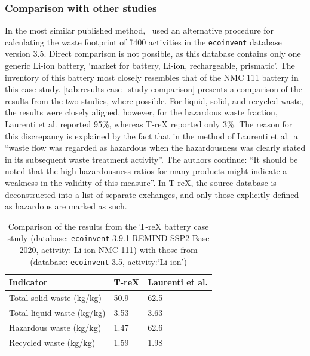 \documentclass[a4paper,fleqn]{cas-dc}
\begin{document}
\subsubsection{Comparison with other studies}\label{sec:results-case_study-comparison}

In the most similar published method,~\cite{laurenti2023wastefootprint} used an
alternative procedure for calculating the waste footprint of \~1400 activities
in the \texttt{ecoinvent} database version 3.5. Direct comparison is not
possible, as this database contains only one generic Li-ion battery, `market
for battery, Li-ion, rechargeable, prismatic'. The inventory of this battery
most closely resembles that of the NMC 111 battery in this case study.
\autoref{tab:results-case_study-comparison} presents a comparison of the
results from the two studies, where possible. For liquid, solid, and recycled
waste, the results were closely aligned, however, for the hazardous waste
fraction, Laurenti et al. reported 95\%, whereas T-reX reported only 3\%. The
reason for this discrepancy is explained by the fact that in the method of
Laurenti et al.\, a ``waste flow was regarded as hazardous when the
hazardousness was clearly stated in its subsequent waste treatment activity''.
The authors continue: ``It should be noted that the high hazardousness ratios
for many products might indicate a weakness in the validity of this measure''.
In T-reX, the source database is deconstructed into a list of separate
exchanges, and only those explicitly defined as hazardous are marked as such.

\begin{table}
	\centering
	\caption{Comparison of the results from the T-reX battery case study (database: \texttt{ecoinvent} 3.9.1 REMIND SSP2 Base 2020, activity: Li-ion NMC 111) with those from \cite{laurenti2023wastefootprint} (database: \texttt{ecoinvent} 3.5, activity:`Li-ion')}\label{tab:results-case_study-comparison}
	\begin{tabular}{lll}
		\toprule
		\textbf{Indicator}         & \textbf{T-reX} & \textbf{Laurenti et al.} \\
		\midrule
		Total solid waste (kg/kg)  & 50.9           & 62.5                     \\
		Total liquid waste (kg/kg) & 3.53           & 3.63                     \\
		Hazardous waste (kg/kg)    & 1.47           & 62.6                     \\
		Recycled waste (kg/kg)     & 1.59           & 1.98                     \\
		\bottomrule
	\end{tabular}
\end{table}
\end{document}
